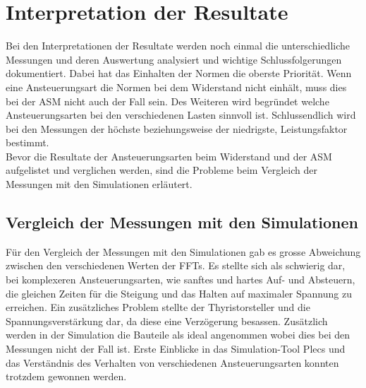 \section{Interpretation der Resultate}\label{sec:Interpretation_Resultate}
Bei den Interpretationen der Resultate werden noch einmal die unterschiedliche Messungen und deren Auswertung analysiert und wichtige Schlussfolgerungen dokumentiert. Dabei hat das Einhalten der Normen die oberste Priorität. Wenn eine Ansteuerungsart die Normen bei dem Widerstand nicht einhält, muss dies bei der ASM nicht auch der Fall sein. Des Weiteren wird begründet welche Ansteuerungsarten bei den verschiedenen Lasten sinnvoll ist. Schlussendlich wird bei den Messungen der höchste beziehungsweise der niedrigste, Leistungsfaktor bestimmt.\\
Bevor die Resultate der Ansteuerungsarten beim Widerstand und der ASM aufgelistet und verglichen werden, sind die Probleme beim Vergleich der Messungen mit den Simulationen erläutert.

\subsection{Vergleich der Messungen mit den Simulationen}
Für den Vergleich der Messungen mit den Simulationen gab es grosse Abweichung zwischen den verschiedenen Werten der FFTs. Es stellte sich als schwierig dar, bei komplexeren Ansteuerungsarten, wie sanftes und hartes Auf- und Absteuern, die gleichen Zeiten für die Steigung und das Halten auf maximaler Spannung zu erreichen. Ein zusätzliches Problem stellte der Thyristorsteller und die Spannungsverstärkung dar, da diese eine Verzögerung besassen. Zusätzlich werden in der Simulation die Bauteile als ideal angenommen wobei dies bei den Messungen nicht der Fall ist. Erste Einblicke in das Simulation-Tool Plecs und das Verständnis des Verhalten von verschiedenen Ansteuerungsarten konnten trotzdem gewonnen werden. 


